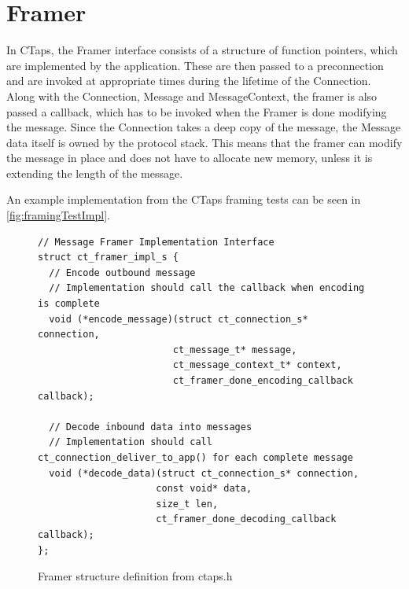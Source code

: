 \section{Framer}
In CTaps, the Framer interface consists of a structure of function pointers,
which are implemented by the application. These are then passed to a preconnection
and are invoked at appropriate times during the lifetime of the Connection.
Along with the Connection, Message and MessageContext, the framer is also
passed a callback, which has to be invoked when the Framer is done modifying
the message. Since the Connection takes a deep copy of the message, the
Message data itself is owned by the protocol stack. This means that the
framer can modify the message in place and does not have to allocate new
memory, unless it is extending the length of the message.

An example
implementation from the CTaps framing tests can be seen in \cref{fig:framingTestImpl}.

\begin{figure}[p]
\begin{verbatim}
// Message Framer Implementation Interface
struct ct_framer_impl_s {
  // Encode outbound message
  // Implementation should call the callback when encoding is complete
  void (*encode_message)(struct ct_connection_s* connection,
                        ct_message_t* message,
                        ct_message_context_t* context,
                        ct_framer_done_encoding_callback callback);

  // Decode inbound data into messages
  // Implementation should call ct_connection_deliver_to_app() for each complete message
  void (*decode_data)(struct ct_connection_s* connection,
                     const void* data,
                     size_t len,
                     ct_framer_done_decoding_callback callback);
};
\end{verbatim}
\caption{Framer structure definition from ctaps.h}
\end{figure}

